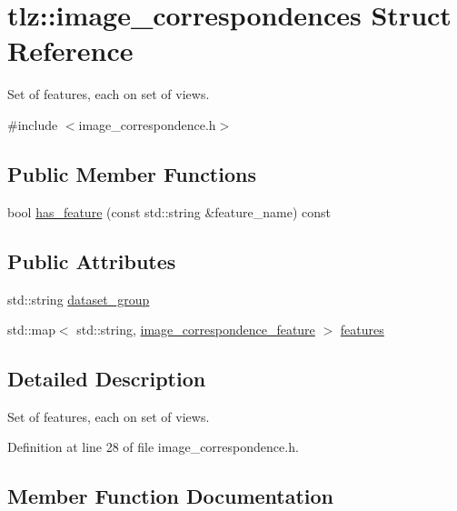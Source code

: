 \hypertarget{structtlz_1_1image__correspondences}{}\section{tlz\+:\+:image\+\_\+correspondences Struct Reference}
\label{structtlz_1_1image__correspondences}


Set of features, each on set of views.  




{\ttfamily \#include $<$image\+\_\+correspondence.\+h$>$}

\subsection*{Public Member Functions}
\begin{DoxyCompactItemize}
\item 
bool \hyperlink{structtlz_1_1image__correspondences_a8367b47db4d0c8e6590f5c0767d3874e}{has\+\_\+feature} (const std\+::string \&feature\+\_\+name) const 
\end{DoxyCompactItemize}
\subsection*{Public Attributes}
\begin{DoxyCompactItemize}
\item 
std\+::string \hyperlink{structtlz_1_1image__correspondences_ad0a69ff1408b408a10c007bcefadcc89}{dataset\+\_\+group}
\item 
std\+::map$<$ std\+::string, \hyperlink{structtlz_1_1image__correspondence__feature}{image\+\_\+correspondence\+\_\+feature} $>$ \hyperlink{structtlz_1_1image__correspondences_a462022e16231b0834eea4f5191469555}{features}
\end{DoxyCompactItemize}


\subsection{Detailed Description}
Set of features, each on set of views. 

Definition at line 28 of file image\+\_\+correspondence.\+h.



\subsection{Member Function Documentation}
